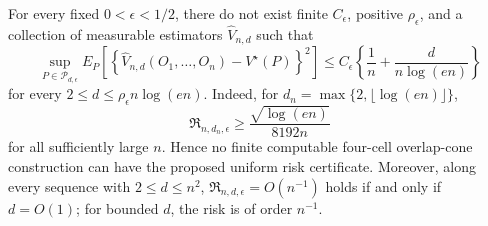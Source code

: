 For every fixed \(0<\epsilon<1/2\), there do not exist finite \(C_\epsilon\), positive \(\rho_\epsilon\), and a collection of measurable estimators \(\widehat V_{n,d}\) such that
\[
 \sup_{P\in\mathcal P_{d,\epsilon}}
 E_P\!\left[
  \left\{\widehat V_{n,d}(O_1,\ldots,O_n)-V^\star(P)\right\}^2
 \right]
 \le C_\epsilon\left\{\frac1n+\frac d{n\log(en)}\right\}
\]
for every \(2\le d\le\rho_\epsilon n\log(en)\).  Indeed, for \(d_n=\max\{2,\lfloor\log(en)\rfloor\}\),
\[
 \mathfrak R_{n,d_n,\epsilon}
 \ge \frac{\sqrt{\log(en)}}{8192n}
\]
for all sufficiently large \(n\).  Hence no finite computable four-cell overlap-cone construction can have the proposed uniform risk certificate.  Moreover, along every sequence with \(2\le d\le n^2\), \(\mathfrak R_{n,d,\epsilon}=O(n^{-1})\) holds if and only if \(d=O(1)\); for bounded \(d\), the risk is of order \(n^{-1}\).